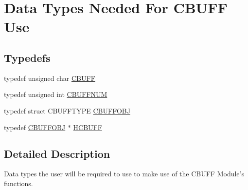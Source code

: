 \hypertarget{group___c_b_u_f_fdata_types}{
\section{Data Types Needed For CBUFF Use}
\label{group___c_b_u_f_fdata_types}
}
\subsection*{Typedefs}
\begin{DoxyCompactItemize}
\item 
typedef unsigned char \hyperlink{group___c_b_u_f_fdata_types_ga4c6278cce108e0ee8bb1b9c609d0cbf4}{CBUFF}
\item 
typedef unsigned int \hyperlink{group___c_b_u_f_fdata_types_gacaab9c1baaec5739b9e9629c51fd7258}{CBUFFNUM}
\item 
typedef struct CBUFFTYPE \hyperlink{group___c_b_u_f_fdata_types_ga2cbf79f31747b0f5cf01750d1d42d12f}{CBUFFOBJ}
\item 
typedef \hyperlink{group___c_b_u_f_fdata_types_ga2cbf79f31747b0f5cf01750d1d42d12f}{CBUFFOBJ} $\ast$ \hyperlink{group___c_b_u_f_fdata_types_ga554880d758aa53ae40930fbb49412e60}{HCBUFF}
\end{DoxyCompactItemize}


\subsection{Detailed Description}
Data types the user will be required to use to make use of the CBUFF Module's functions. 

